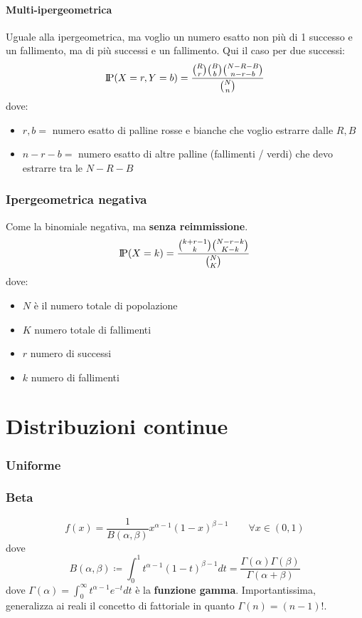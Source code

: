 \documentclass[a4paper,10pt]{article}
\newcommand{\pr}{\text{I\kern-0.15em P}} %
\theoremstyle{remark}
\theoremstyle{definition}
\begin{document}
\subsection*{Multi-ipergeometrica}
Uguale alla ipergeometrica, ma voglio un numero esatto non più di 1 successo e un fallimento, ma di più successi e un fallimento. Qui il caso per due successi:
$$\pr(X=r,Y=b)=\frac{\binom{R}{r}\binom{B}{b}\binom{N-R-B}{n-r-b}}{\binom{N}{n}}$$
dove:
\begin{itemize}
    \item $r,b=$ numero esatto di palline rosse e bianche che voglio estrarre dalle $R,B$
    \item $n-r-b=$ numero esatto di altre palline (fallimenti / verdi) che devo estrarre tra le $N-R-B$
\end{itemize}


\section{Ipergeometrica negativa}
Come la binomiale negativa, ma \textbf{senza reimmissione}.
$$\pr(X=k)=\frac{\binom{k+r-1}{k}\binom{N-r-k}{K-k}}{\binom{N}{K}}$$
dove:
\begin{itemize}
    \item $N$ è il numero totale di popolazione
    \item $K$ numero totale di fallimenti
    \item $r$ numero di successi
    \item $k$ numero di fallimenti
\end{itemize}











\newpage
\part*{Distribuzioni continue}
\section{Uniforme}
\section{Beta}
$$f(x)=\frac{1}{B(\alpha,\beta)}x^{\alpha-1}(1-x)^{\beta-1} \quad \quad \forall x\in(0,1)$$
dove $$B(\alpha,\beta) \coloneqq \int_0^1 t^{\alpha-1}(1-t)^{\beta-1}dt=\frac{\Gamma(\alpha)\Gamma(\beta)}{\Gamma(\alpha+\beta)}$$
dove $\Gamma(\alpha)=\int_0^\infty t^{\alpha-1}e^{-t}dt$ è la \textbf{funzione gamma}. Importantissima, generalizza ai reali il concetto di fattoriale in quanto $\Gamma(n)=(n-1)!$.
\end{document}
